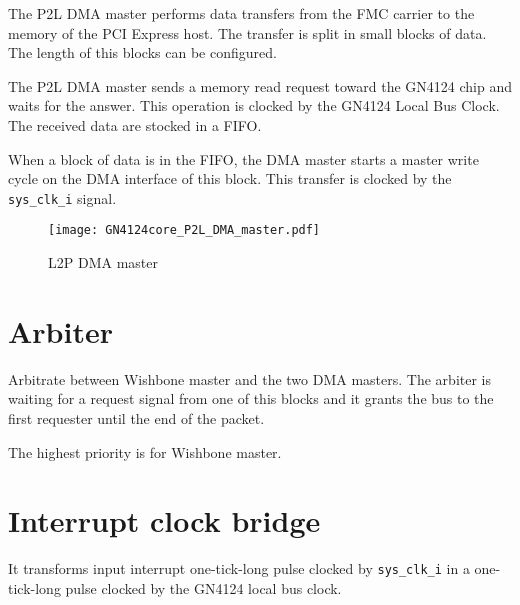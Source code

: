 \documentclass[10pt,a4paper]{cerndoc}
\begin{document}
 The P2L DMA master performs data transfers from the FMC carrier to the memory of the PCI Express host. The transfer is split in small blocks of data. The length of this blocks can be configured.
 
 The P2L DMA master sends a memory read request toward the GN4124 chip and waits for the answer. This operation is clocked by the GN4124 Local Bus Clock. The received data are stocked in a FIFO. 
 
When a block of data is in the FIFO, the DMA master starts a master write cycle on the DMA interface of this block. This transfer is clocked by the \verb+sys_clk_i+ signal. 
 
 \begin{figure}[!ht]
	\centering
		\texttt{[image: GN4124core\_P2L\_DMA\_master.pdf]}
	\caption{L2P DMA master}
	\label{fig:GN4124core_p2l_dma_master}
\end{figure}
 
 \section{Arbiter}
Arbitrate between Wishbone master and the two DMA masters. The arbiter is waiting for a request signal from one of this blocks and it grants the bus to the first requester until the end of the packet.

The highest priority is for Wishbone master.
 
  \section{Interrupt clock bridge}
  It transforms input interrupt one-tick-long pulse clocked by \verb+sys_clk_i+ in a one-tick-long pulse clocked by the GN4124 local bus clock.
\end{document}
